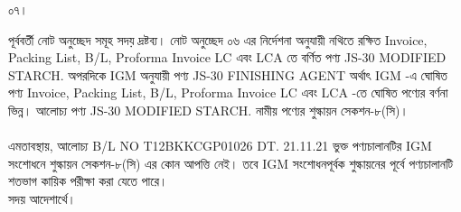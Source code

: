 \documentclass[12pt]{article}
\begin{document}
\noindent
\begin{minipage}[t]{0.05\linewidth}
০৭।
\end{minipage}
\begin{minipage}[t]{0.95\linewidth}
পূর্ববর্তী নোট অনুচ্ছেদ সমূহ সদয় দ্রষ্টব্য।
নোট অনুচ্ছেদ ০৬ এর নির্দেশনা অনুযায়ী নথিতে
রক্ষিত
Invoice, Packing List, B/L, Proforma Invoice LC
এবং
LCA
তে বর্ণিত পণ্য
JS-30
MODIFIED STARCH.
অপরদিকে
IGM অনুযায়ী পণ্য
JS-30
FINISHING AGENT
অর্থাৎ
IGM
-এ ঘোষিত পণ্য
Invoice, Packing List, B/L, Proforma Invoice LC
এবং
LCA
-তে ঘোষিত পণ্যের
বর্ণনা ভিন্ন।
আলোচ্য পণ্য
JS-30
MODIFIED STARCH.
নামীয় পণ্যের শুল্কায়ন
সেকশন-৮(সি)।
\\
\\
এমতাবস্থায়, আলোচ্য
B/L NO T12BKKCGP01026
DT. 21.11.21
ভুক্ত পণ্যচালানটির IGM
সংশোধনে শুল্কায়ন সেকশন-৮(সি) এর
কোন আপত্তি নেই। তবে IGM সংশোধনপূর্বক শুল্কায়নের পূর্বে পণ্যচালানটি শতভাগ কায়িক পরীক্ষা করা যেতে পারে।
\\
সদয় আদেশার্থে।
\end{minipage}
\end{document}
